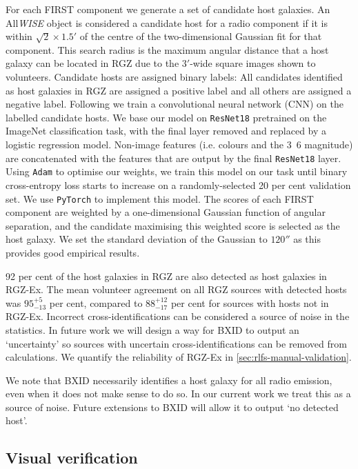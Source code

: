 \documentclass[11pt, a4paper]{book}
\begin{document}
For each FIRST component we generate a set of candidate host galaxies.
An All\emph{WISE} object is considered a candidate host for a radio
component if it is within $\sqrt{2} \times 1.5'$ of the centre of the two-dimensional
Gaussian fit for that component. This search radius is the maximum
angular distance that a host galaxy can be located in RGZ due to the
$3'$-wide square images shown to volunteers. Candidate hosts are
assigned binary labels: All candidates identified as host galaxies in
RGZ are assigned a positive label and all others are assigned a
negative label. Following \citet{alger18radio} we train a convolutional neural
network (CNN) on the labelled candidate hosts. We
base our model on \texttt{ResNet18} \citep{he2016resnet} pretrained on the
ImageNet classification task, with the final layer removed and replaced
by a logistic regression model. Non-image features (i.e. colours and the
\unit{3.6}{\micro\meter} magnitude) are concatenated with the features
that are output by the final \texttt{ResNet18} layer. Using \texttt{Adam}
\citep{kingma14adam} to optimise our weights, we train this model on our
task until binary cross-entropy loss starts to increase on a
randomly-selected 20 per cent validation set. We use \texttt{PyTorch}
\citep{paszke2017pytorch} to implement this model. The scores of each FIRST
component are weighted by a one-dimensional Gaussian function of angular separation, and the
candidate maximising this weighted score is selected as the host galaxy. We
set the standard deviation of the Gaussian to $120''$ as this provides good
empirical results.

92 per cent of the host galaxies in RGZ are also detected as host galaxies in RGZ-Ex. The mean volunteer agreement on all RGZ sources with detected hosts was $95^{+5}_{-13}$ per cent, compared to $88^{+12}_{-17}$ per cent for sources with hosts not in RGZ-Ex. Incorrect cross-identifications can be considered a source of noise in the statistics. In future work we will design a way for BXID to output an `uncertainty' so sources with uncertain cross-identifications can be removed from calculations. We quantify the reliability of RGZ-Ex in \autoref{sec:rlfs-manual-validation}.

We note that BXID necessarily identifies a host galaxy for all radio emission, even when it does not
make sense to do so. In our current work we treat this as a source of
noise. Future extensions to BXID will allow it to output `no detected
host'.

    \subsection{Visual verification}\label{sec:rlfs-manual-validation}
\end{document}

